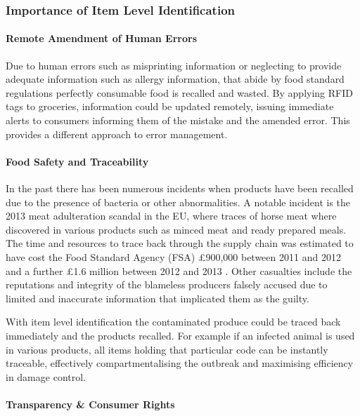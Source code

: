 \documentclass[a4paper, 11pt]{article}
\begin{document}
\vspace{\baselineskip}
\vspace{\baselineskip}
\vspace{\baselineskip}

\subsubsection{Importance of Item Level Identification}

\paragraph{Remote Amendment of Human Errors}
Due to human errors such as misprinting information or neglecting to provide adequate information such as allergy information, that abide by food standard regulations perfectly consumable food is recalled and wasted.\cite{FDA} By applying RFID tags to groceries, information could be updated remotely, issuing immediate alerts to consumers informing them of the mistake and the amended error. This provides a different approach to error management.

\paragraph{Food Safety and Traceability}
In the past there has been numerous incidents when products have been recalled due to the presence of bacteria or other abnormalities. A notable incident is the 2013 meat adulteration scandal in the EU, where traces of horse meat where discovered in various products such as minced meat and ready prepared meals. The time and resources to trace back through the supply chain was estimated to have cost the Food Standard Agency (FSA) \pounds900,000 between 2011 and 2012 and a further \pounds1.6 million between 2012 and 2013 \cite{FSA}. Other casualties include the reputations and integrity of the blameless producers falsely accused due to limited and inaccurate information that implicated them as the guilty.\cite{horsy}

With item level identification the contaminated produce could be traced back immediately and the products recalled.\cite{rfidFood}\cite{rfidFood2} For example if an infected animal is used in various products, all items holding that particular code can be instantly traceable, effectively compartmentalising the outbreak and maximising efficiency in damage control.

\paragraph{Transparency \& Consumer Rights}
\end{document}
